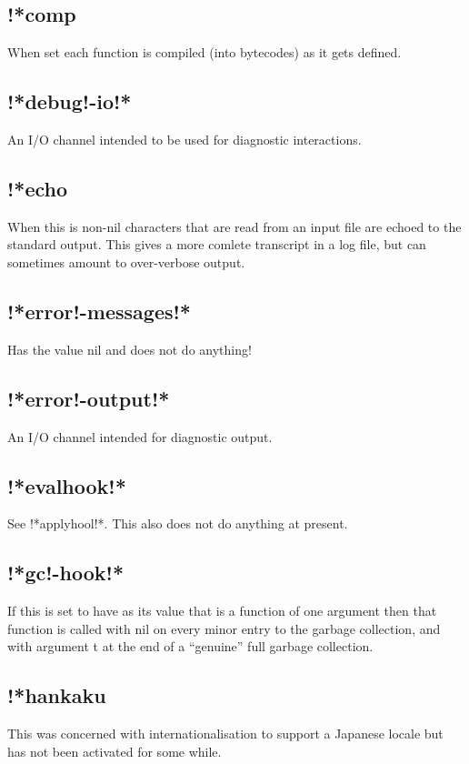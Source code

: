 \documentclass[a4paper,11pt]{article}
\begin{document}
\subsection{\ttfamily !*comp}
When set each function is compiled (into bytecodes) as it gets defined.

\subsection{\ttfamily !*debug!-io!*}
An I/O channel intended to be used for diagnostic interactions.

\subsection{\ttfamily !*echo}
When this is non-nil characters that are read from an input file are
echoed to the standard output. This gives a more comlete transcript in
a log file, but can sometimes amount to over-verbose output.

\subsection{\ttfamily !*error!-messages!*}
Has the value nil and does not do anything!

\subsection{\ttfamily !*error!-output!*}
An I/O channel intended for diagnostic output.

\subsection{\ttfamily !*evalhook!*}
See {\ttfamily !*applyhool!*}. This also does not do anything at present.

\subsection{\ttfamily !*gc!-hook!*}
If this is set to have as its value that is a function of one argument then
that function is called with {\ttfamily nil} on every minor entry to the
garbage collection, and with argument {\ttfamily t} at the end of a ``genuine''
full garbage collection.

\subsection{\ttfamily !*hankaku}
This was concerned with internationalisation to support a Japanese
locale but has not been activated for some while.
\end{document}
